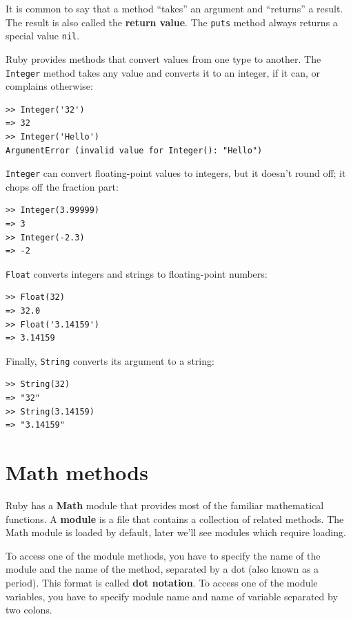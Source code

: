 \documentclass[10pt]{book}
\begin{document}
It is common to say that a method ``takes'' an argument and ``returns''
a result.  The result is also called the {\bf return value}.  The {\tt puts}
method always returns a special value {\tt nil}.

Ruby provides methods that convert values
from one type to another.  The {\tt Integer} method takes any value and
converts it to an integer, if it can, or complains otherwise:

\begin{verbatim}
>> Integer('32')
=> 32
>> Integer('Hello')
ArgumentError (invalid value for Integer(): "Hello")
\end{verbatim}
%
{\tt Integer} can convert floating-point values to integers, but it
doesn't round off; it chops off the fraction part:

\begin{verbatim}
>> Integer(3.99999)
=> 3
>> Integer(-2.3)
=> -2
\end{verbatim}
%
{\tt Float} converts integers and strings to floating-point
numbers:

\begin{verbatim}
>> Float(32)
=> 32.0
>> Float('3.14159')
=> 3.14159
\end{verbatim}
%
Finally, {\tt String} converts its argument to a string:

\begin{verbatim}
>> String(32)
=> "32"
>> String(3.14159)
=> "3.14159"
\end{verbatim}
%

\section{Math methods}

Ruby has a {\bf Math} module that provides most of the familiar
mathematical functions.  A {\bf module} is a file that contains a
collection of related methods.  The Math module is loaded
by default, later we'll see modules which require loading.

To access one of the module methods, you have to specify the name
of the module and the name of the method, separated by a dot (also
known as a period).  This format is called {\bf dot notation}.  To
access one of the module variables, you have to specify module name
and name of variable separated by two colons.
\end{document}
